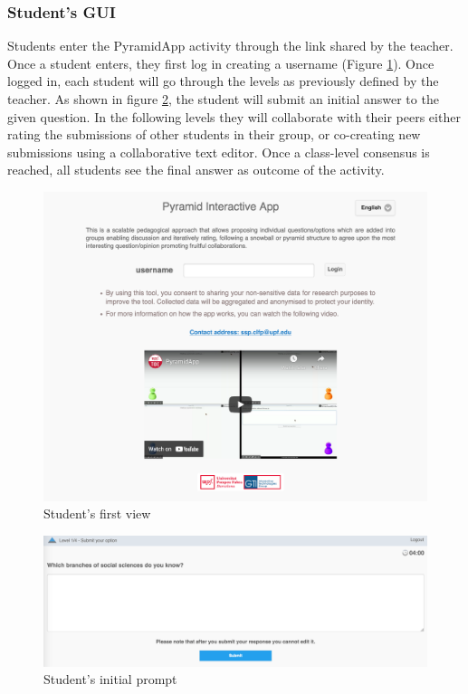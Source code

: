 \subsubsection{Student's GUI}
Students enter the PyramidApp activity through the link shared by the teacher. Once a student enters, they first log in creating a username (Figure \ref{fig:P6}). Once logged in, each student will go through the levels as previously defined by the teacher. As shown in figure \ref{fig:P7}, the student will submit an initial answer to the given question. In the following levels they will collaborate with their peers either rating the submissions of other students in their group, or co-creating new submissions using a collaborative text editor. Once a class-level consensus is reached, all students see the final answer as outcome of the activity.
\begin{figure}[!h]
    \includegraphics[clip,width=\columnwidth]{Figures/pyramidapp6.png}%
\caption{Student's first view}
\label{fig:P6}
\end{figure}
\begin{figure}[!h]
    \includegraphics[clip,width=\columnwidth]{Figures/pyramidapp7.png}%
\caption{Student's initial prompt}
\label{fig:P7}
\end{figure}

